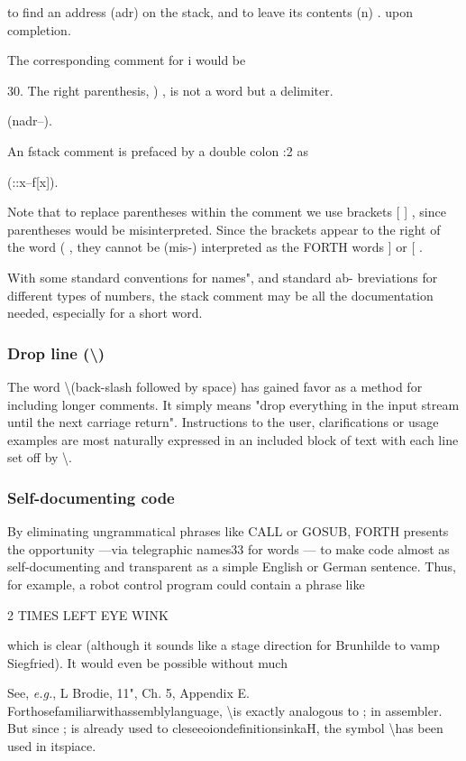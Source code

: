 to find an address (adr) on the stack, and to leave its contents (n) .
upon completion.

The corresponding comment for i would be

 

30. The right parenthesis, ) , is not a word but a delimiter.

(nadr--).

An fstack comment is prefaced by a double colon :2 as

(::x--f[x]).

Note that to replace parentheses within the comment we use
brackets [ ] , since parentheses would be misinterpreted. Since
the brackets appear to the right of the word ( , they cannot be
(mis-) interpreted as the FORTH words ] or [ .

With some standard conventions for names", and standard ab-
breviations for different types of numbers, the stack comment
may be all the documentation needed, especially for a short word.

\subsubsection{Drop line (\textbackslash)}
The word \textbackslash (back-slash followed by space) has gained favor as a method for including longer comments. It simply means "drop everything in the input stream until the next carriage return". Instructions to the user, clarifications or usage examples are most naturally expressed in an included block of text with each line set off by \textbackslash .

\subsubsection{Self-documenting code}
By eliminating ungrammatical phrases like CALL or GOSUB,
FORTH presents the opportunity —via telegraphic names33 for
words — to make code almost as self-documenting and
transparent as a simple English or German sentence. Thus, for
example, a robot control program could contain a phrase like

2 TIMES LEFT EYE WINK

which is clear (although it sounds like a stage direction for Brunhilde to vamp Siegfried). It would even be possible without much

See, \textit{e.g.}, L Brodie, 11", Ch. 5, Appendix E.
Forthosefamiliarwithassemblylanguage, \textbackslash is exactly analogous to ; in assembler. But since ; is already used to cleseeoiondefinitionsinkaH, the symbol \textbackslash has been used in itspiace.

